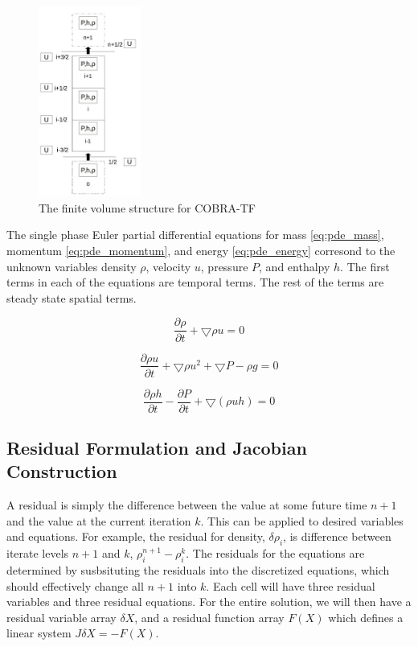 \documentclass{mc2015}
\begin{document}
\begin{figure}[!h]
	\centering
	\includegraphics[width=0.30\textwidth]{images/CTF-Cells}
	\caption{The finite volume structure for COBRA-TF}
	\label{fig:CTF-Cells}
\end{figure}

The single phase Euler partial differential equations for mass
\eqref{eq:pde_mass}, momentum \eqref{eq:pde_momentum}, and energy
\eqref{eq:pde_energy} corresond to the unknown variables density $\rho$,
velocity $u$, pressure $P$, and enthalpy $h$. The first terms in each of the
equations are temporal terms. The rest of the terms are steady state spatial
terms. 
    
    \begin{equation}
    	\label{eq:pde_mass}
    	\frac{ \partial \rho}{\partial t} + \bigtriangledown \rho u = 0
    \end{equation}
    
    \begin{equation}
    	\label{eq:pde_momentum}
    	\frac{ \partial \rho u}{\partial t} + \bigtriangledown \rho u^{2} +
    	\bigtriangledown P - \rho g  = 0
    \end{equation}
    
    \begin{equation}
    	\label{eq:pde_energy}
    	\frac{ \partial \rho h}{\partial t} -
    	\frac{ \partial  P}{\partial t} + 
    	\bigtriangledown ( \rho  u h )
    	= 0
    \end{equation}

\subsection{Residual Formulation and Jacobian Construction}

	A residual is simply the difference between the value at some future time
    $n+1$ and the value at the current iteration $k$. This can be applied to
    desired variables and equations. For example, the residual for density,
    $\delta \rho_{i}$, is difference between iterate levels
    $n+1$ and $k$, $\rho^{n+1}_{i} - \rho^{k}_{i}$. The residuals for the
    equations are determined by susbsituting the residuals into the discretized
    equations, which should effectively change all $n+1$ into $k$. Each cell
    will have three residual variables and three residual equations. For the
    entire solution, we will then have a residual variable array $\delta X$, and
    a residual function array $F(X)$ which defines a linear system $J \delta X =
    - F(X)$.
    
\end{document}
